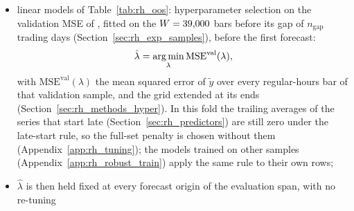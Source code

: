 \begin{itemize}
\begin{itemize}
  \item linear models of Table~\ref{tab:rh_oos}: hyperparameter selection on the validation MSE of
    \rhorPenSample{}, fitted on the $W = 39{,}000$ bars before its gap of $n_{\mathrm{gap}}$ trading days
    (Section~\ref{sec:rh_exp_samples}), before the first forecast:
    \[
      \hat\lambda = \operatorname*{arg\,min}_{\lambda} \mathrm{MSE}^{\mathrm{val}}(\lambda),
    \]
    with $\mathrm{MSE}^{\mathrm{val}}(\lambda)$ the mean squared error of $\tilde y$ over every regular-hours bar of
    that validation sample, and the grid extended at its ends (Section~\ref{sec:rh_methods_hyper}). In this fold
    the trailing averages of the series that start late (Section~\ref{sec:rh_predictors}) are still zero under
    the late-start rule, so the full-set penalty is chosen without them (Appendix~\ref{app:rh_tuning}); the models
    trained on other samples (Appendix~\ref{app:rh_robust_train}) apply the same rule to their own rows;
  \item $\hat\lambda$ is then held fixed at every forecast origin of the evaluation span, with no re-tuning

\end{itemize}
\end{itemize}
